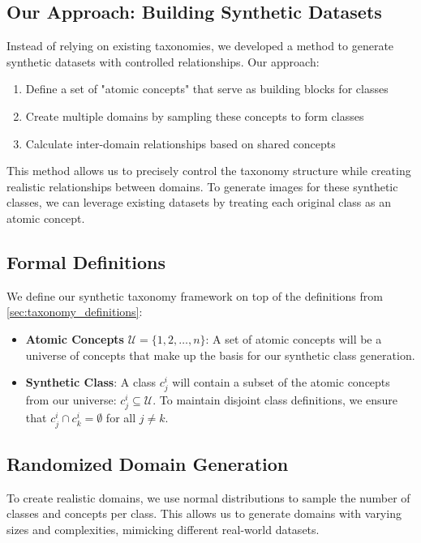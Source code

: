 \subsection{Our Approach: Building Synthetic Datasets}

Instead of relying on existing taxonomies, we developed a method to generate synthetic datasets with controlled relationships. Our approach:

\begin{enumerate}
    \item Define a set of "atomic concepts" that serve as building blocks for classes
    \item Create multiple domains by sampling these concepts to form classes
    \item Calculate inter-domain relationships based on shared concepts
\end{enumerate}

This method allows us to precisely control the taxonomy structure while creating realistic relationships between domains. To generate images for these synthetic classes, we can leverage existing datasets by treating each original class as an atomic concept.

\subsection{Formal Definitions}

We define our synthetic taxonomy framework on top of the definitions from \autoref{sec:taxonomy_definitions}:

\begin{itemize}
    \item \textbf{Atomic Concepts} $\mathcal{U}=\{1,2,\ldots,n\}$:
          A set of atomic concepts will be a universe of concepts that make up the basis for our synthetic class generation.
    \item \textbf{Synthetic Class}: A class $c^i_j$ will contain a subset of the atomic concepts
          from our universe: $c^i_j \subseteq \mathcal{U}$.
          To maintain disjoint class definitions, we ensure that $c^i_j \cap c^i_k = \emptyset$ for all $j \neq k$.
\end{itemize}

\subsection{Randomized Domain Generation}

To create realistic domains, we use normal distributions to sample the number of classes and concepts per class.
This allows us to generate domains with varying sizes and complexities, mimicking different real-world datasets.

